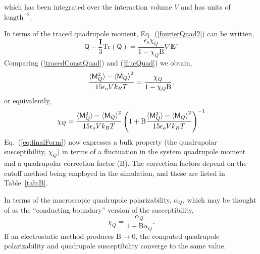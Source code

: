 which has been integrated over the interaction volume $V$ and has
units of $\mathrm{length}^{-2}$.

In terms of the traced quadrupole moment, Eq.~(\ref{fourierQuad2})
can be written,
\begin{equation}
\mathsf{Q} - \frac{\mathbf{I}}{3} \mathrm{Tr}(\mathsf{Q})
= \frac{\epsilon_o {\chi}_Q}{1-  {\chi}_Q \mathrm{B}} \nabla \mathbf{E}^\circ
\label{tracedConstQuad}
\end{equation}
Comparing (\ref{tracedConstQuad}) and (\ref{flucQuad}) we obtain,
\begin{equation}
\frac{\braket{\mathsf{M}_Q^2}-{\braket{\mathsf{M}_Q}}^2}{15 \epsilon_o
  V k_B T} = \frac{\chi_Q} {1 - \chi_Q \mathrm{B}},
\end{equation}
or equivalently,
\begin{equation}
\chi_Q = \frac{\braket{\mathsf{M}_Q^2}-{\braket{\mathsf{M}_Q}}^2}{15 \epsilon_o
  V k_B T} \left(1 + \mathrm{B} \frac{\braket{\mathsf{M}_Q^2}-{\braket{\mathsf{M}_Q}}^2}{15 \epsilon_o
  V k_B T} \right)^{-1}
\label{eq:finalForm}
\end{equation}
Eq.~(\ref{eq:finalForm}) now expresses a bulk property (the
quadrupolar susceptibility, $\chi_Q$) in terms of a fluctuation in the
system quadrupole moment and a quadrupolar correction factor
($\mathrm{B}$).  The correction factors depend on the cutoff method
being employed in the simulation, and these are listed in Table~\ref{tab:B}.

In terms of the macroscopic quadrupole polarizability, $\alpha_Q$,
which may be thought of as the ``conducting boundary'' version of the
susceptibility,
\begin{equation}
\chi_Q = \frac{\alpha_Q}{1 + \mathrm{B} \alpha_Q}.
\label{eq:quadrupolarSusceptiblity}
\end{equation}
If an electrostatic method produces $\mathrm{B} \rightarrow 0$, the computed
quadrupole polarizability and quadrupole susceptibility converge to
the same value.

